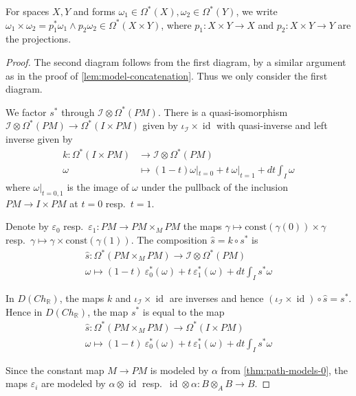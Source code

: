 \documentclass{scrartcl}
\theoremstyle{plain}
\theoremstyle{definition}
\newcommand{\R}{\mathbb R}
\renewcommand{\epsilon}{\varepsilon}
\DeclareMathOperator{\id}{id}
\newcommand{\comp}{\mathbin{\circ}}
\begin{document}
For spaces $X, Y$ and forms $\omega_1\in\Omega^*(X), \omega_2\in\Omega^*(Y)$, we write $\omega_1\times\omega_2 = p_1^*\omega_1 \wedge p_2\omega_2\in\Omega^*(X\times Y)$, where $p_1\colon X\times Y\to X$ and $p_2\colon X\times Y\to Y$ are the projections.

\begin{proof}
    The second diagram follows from the first diagram, by a similar argument as in the proof of \cref{lem:model-concatenation}. Thus we only consider the first diagram.

    We factor $s^*$ through $\mathcal I\otimes \Omega^*(PM)$. There is a quasi-isomorphism $\mathcal I\otimes\Omega^*(PM)\to \Omega^*(I\times PM)$ given by $\iota_{\mathcal I}\times\id$ with quasi-inverse and left inverse given by 
    \begin{align*}
        k\colon\Omega^*(I\times PM) &\to \mathcal I \otimes \Omega^*(PM) \\
        \omega & \mapsto (1-t)\omega|_{t=0} + t\ \omega|_{t=1} + dt \int_I \omega
    \end{align*}
    where $\omega|_{t=0,1}$ is the image of $\omega$ under the pullback of the inclusion $PM\to I\times PM$ at $t=0$ resp.\ $t=1$.

    Denote by $\epsilon_{0}$ resp.\ $\epsilon_1\colon PM\to PM\times_M PM$ the maps $\gamma\mapsto \mathrm{const}(\gamma(0))\times \gamma$ resp.\ $\gamma\mapsto \gamma\times \mathrm{const}(\gamma(1))$. The composition $\hat s = k\comp s^*$ is
    \begin{align*}
        \hat s\colon \Omega^*(PM\times_M PM)\to \mathcal I\otimes\Omega^*(PM)\\
        \omega \mapsto (1-t)\ \epsilon_0^*(\omega) + t\ \epsilon_1^*(\omega) + dt \int_I s^*\omega
    \end{align*}

    In $D(Ch_{\R})$, the maps $k$ and $\iota_{\mathcal I}\times \id$ are inverses and hence $(\iota_{\mathcal I}\times \id)\comp \hat s = s^*$. Hence in $D(Ch_{\R})$, the map $s^*$ is  equal to the map
    \begin{align*}
        \hat s\colon \Omega^*(PM\times_M PM)\to \Omega^*(I\times PM)\\
        \omega \mapsto (1-t)\ \epsilon_0^*(\omega) + t\ \epsilon_1^*(\omega) + dt \int_I s^*\omega
    \end{align*}

    Since the constant map $M\to PM$ is modeled by $\alpha$ from \cref{thm:path-models-0}, the maps $\epsilon_i$ are modeled by $\alpha\otimes\id$ resp.\ $\id\otimes\alpha\colon B\otimes_A B\to B$.
    

\end{proof}
\end{document}

